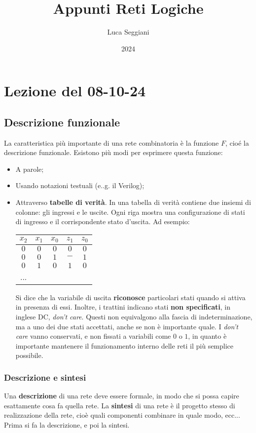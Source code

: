 \documentclass[a4paper,11pt]{article}
\title{Appunti Reti Logiche}
\author{Luca Seggiani}
\date{2024}
\begin{document}
\section{Lezione del 08-10-24}

\thispagestyle{empty}
\pagestyle{fancy}

\subsection{Descrizione funzionale}
La caratteristica più importante di una rete combinatoria è la funzione $F$, cioé la descrizione funzionale.
Esistono più modi per esprimere questa funzione:
\begin{itemize}
	\item A parole;
	\item Usando notazioni testuali (e..g. il Verilog);
	\item Attraverso \textbf{tabelle di verità}.
		In una tabella di verità contiene due insiemi di colonne: gli ingressi e le uscite.
		Ogni riga mostra una configurazione di stati di ingresso e il corrispondente stato d'uscita. Ad esempio:
	\begin{table}[H]
		\center 
		\begin{tabular} { c  c  c | c c }
			$x_2$ & $x_1$ & $x_0$ & $z_1$ & $z_0$ \\ 
			\hline 
			$0$ & $0$ & $0$ & $0$ & $0$ \\
			$0$ & $0$ & $1$ & $-$ & $1$ \\
			$0$ & $1$ & $0$ & $1$ & $0$ \\
			...
		\end{tabular}
	\end{table}
	Si dice che la variabile di uscita \textbf{riconosce} particolari stati quando si attiva in presenza di essi.
	Inoltre, i trattini indicano stati \textbf{non specificati}, in inglese DC, \textit{don't care}.
	Questi non equivalgono alla fascia di indeterminazione, ma a uno dei due stati accettati, anche se non è importante quale.
	I \textit{don't care} vanno conservati, e non fissati a variabili come $0$ o $1$, in quanto è importante mantenere il funzionamento interno delle reti il più semplice possibile. 
\end{itemize}

\subsubsection{Descrizione e sintesi}
Una \textbf{descrizione} di una rete deve essere formale, in modo che si possa capire esattamente cosa fa quella rete.
La \textbf{sintesi} di una rete è il progetto stesso di realizzazione della rete, cioè quali componenti combinare in quale modo, ecc...
Prima si fa la descrizione, e poi la sintesi.
\end{document}
